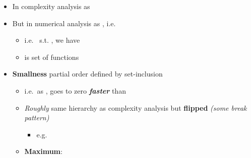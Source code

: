 \begin{itemize}

  \item
        In complexity analysis  as 
  \item
        But in numerical analysis  as
        ,
        i.e.~

        \begin{itemize}

          \item
                i.e.~ s.t. \iMbox{\forall \epsilon}, we
                have
          \item
                 is set of functions
        \end{itemize}
  \item
        \textbf{Smallness} partial order 
        defined by set-inclusion 

        \begin{itemize}

          \item
                i.e.~as ,  goes to zero
                \textbf{\emph{faster}} than 
          \item
                \emph{Roughly} same hierarchy as complexity analysis but
                \textbf{flipped} \emph{(some break pattern)}

                \begin{itemize}

                  \item
                        e.g.~
                \end{itemize}
          \item
                \textbf{Maximum}:


\end{itemize}
\end{itemize}
